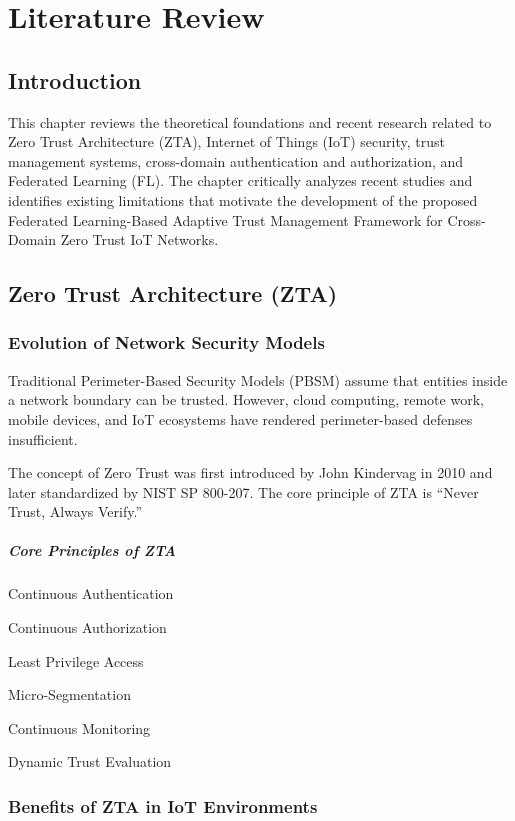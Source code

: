 \chapter{Literature Review}

\section{Introduction}

This chapter reviews the theoretical foundations and recent research related to Zero Trust Architecture (ZTA), Internet of Things (IoT) security, trust management systems, cross-domain authentication and authorization, and Federated Learning (FL). The chapter critically analyzes recent studies and identifies existing limitations that motivate the development of the proposed Federated Learning-Based Adaptive Trust Management Framework for Cross-Domain Zero Trust IoT Networks.


\section{Zero Trust Architecture (ZTA)}

\subsection{Evolution of Network Security Models}

Traditional Perimeter-Based Security Models (PBSM) assume that entities inside a network boundary can be trusted. However, cloud computing, remote work, mobile devices, and IoT ecosystems have rendered perimeter-based defenses insufficient.


The concept of Zero Trust was first introduced by John Kindervag in 2010 and later standardized by NIST SP 800-207. The core principle of ZTA is “Never Trust, Always Verify.”


\paragraph{Core Principles of ZTA}

Continuous Authentication


Continuous Authorization


Least Privilege Access


Micro-Segmentation


Continuous Monitoring


Dynamic Trust Evaluation


\subsection{Benefits of ZTA in IoT Environments}

